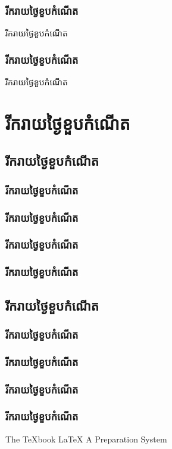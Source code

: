 \documentclass[11pt,a4paper]{diamond}
\begin{document}
	\section{រីករាយថ្ងៃខួបកំណើត}
	\begin{practice}
		រីករាយថ្ងៃខួបកំណើត
	\end{practice}
	\section{រីករាយថ្ងៃខួបកំណើត}
	\begin{explanation}
		រីករាយថ្ងៃខួបកំណើត
	\end{explanation}
	\part{រីករាយថ្ងៃខួបកំណើត}
	\chapter{រីករាយថ្ងៃខួបកំណើត}
	\section{រីករាយថ្ងៃខួបកំណើត}
	\section{រីករាយថ្ងៃខួបកំណើត}
	\section{រីករាយថ្ងៃខួបកំណើត}
	\section{រីករាយថ្ងៃខួបកំណើត}
	\appendix
	\chapter{រីករាយថ្ងៃខួបកំណើត}
	\section{រីករាយថ្ងៃខួបកំណើត}
	\section{រីករាយថ្ងៃខួបកំណើត}
	\section{រីករាយថ្ងៃខួបកំណើត}
	\section{រីករាយថ្ងៃខួបកំណើត}
	\backmatter
	\begin{thebibliography}{2}
		 The TeXbook
		 LaTeX A Preparation System
	\end{thebibliography}
\end{document}
